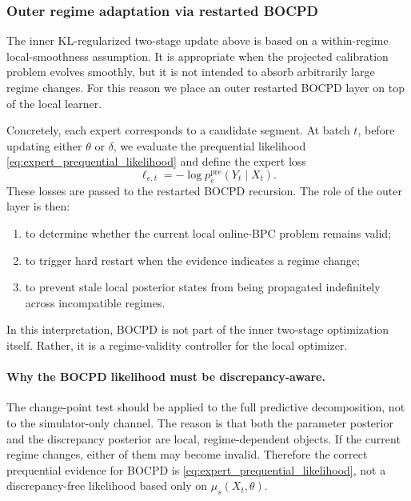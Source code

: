 \documentclass{article}
\begin{document}
\subsubsection{Outer regime adaptation via restarted BOCPD}
\label{sec:rbocpd_outer_layer_online_bpc}

The inner KL-regularized two-stage update above is based on a within-regime local-smoothness assumption. It is appropriate when the projected calibration problem evolves smoothly, but it is not intended to absorb arbitrarily large regime changes. For this reason we place an outer restarted BOCPD layer on top of the local learner.

Concretely, each expert corresponds to a candidate segment. At batch $t$, before updating either $\theta$ or $\delta$, we evaluate the prequential likelihood \eqref{eq:expert_prequential_likelihood} and define the expert loss
\begin{equation}
\ell_{e,t}
=
-\log p_e^{\mathrm{pre}}(Y_t\mid X_t).
\label{eq:expert_loss_online_bpc}
\end{equation}
These losses are passed to the restarted BOCPD recursion. The role of the outer layer is then:
\begin{enumerate}[leftmargin=1.5em]
    \item to determine whether the current local online-BPC problem remains valid;
    \item to trigger hard restart when the evidence indicates a regime change;
    \item to prevent stale local posterior states from being propagated indefinitely across incompatible regimes.
\end{enumerate}
In this interpretation, BOCPD is not part of the inner two-stage optimization itself. Rather, it is a regime-validity controller for the local optimizer.

\paragraph{Why the BOCPD likelihood must be discrepancy-aware.}
The change-point test should be applied to the full predictive decomposition, not to the simulator-only channel. The reason is that both the parameter posterior and the discrepancy posterior are local, regime-dependent objects. If the current regime changes, either of them may become invalid. Therefore the correct prequential evidence for BOCPD is \eqref{eq:expert_prequential_likelihood}, not a discrepancy-free likelihood based only on $\mu_s(X_t,\theta)$.
\end{document}
